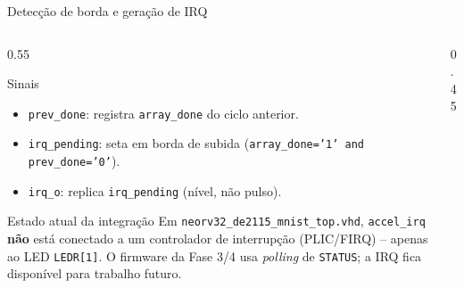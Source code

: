 \documentclass[aspectratio=169,10pt]{beamer}
\begin{document}
\begin{frame}{Detecção de borda e geração de IRQ}
  \begin{columns}[T]
    \begin{column}{0.55\textwidth}
      \begin{block}{Sinais}
        \begin{itemize}
          \item \texttt{prev\_done}: registra \texttt{array\_done} do ciclo anterior.
          \item \texttt{irq\_pending}: seta em borda de subida
            (\texttt{array\_done='1' and prev\_done='0'}).
          \item \texttt{irq\_o}: replica \texttt{irq\_pending} (nível, não pulso).
        \end{itemize}
      \end{block}
      \begin{alertblock}{Estado atual da integração}
        Em \texttt{neorv32\_de2115\_mnist\_top.vhd}, \texttt{accel\_irq} \textbf{não}
        está conectado a um controlador de interrupção (PLIC/FIRQ) --
        apenas ao LED \texttt{LEDR[1]}. O firmware da Fase 3/4 usa
        \emph{polling} de \texttt{STATUS}; a IRQ fica disponível para
        trabalho futuro.
      \end{alertblock}
    \end{column}
    \begin{column}{0.45\textwidth}
      \centering
    \end{column}
  \end{columns}
\end{frame}
\end{document}

